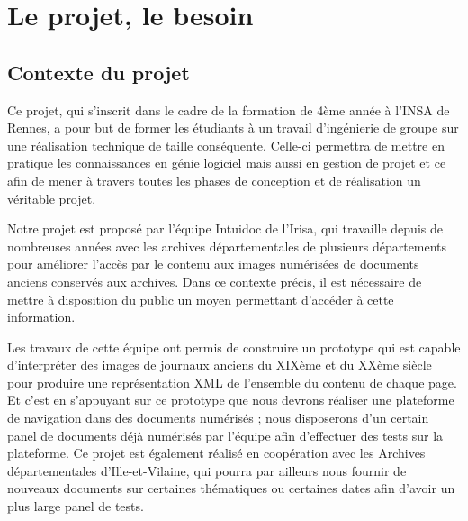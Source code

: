 \section{Le projet, le besoin}
\label{sec:intro}

    \subsection{Contexte du projet}
    \label{subsec:contexte}
    Ce projet, qui s’inscrit dans le cadre de la formation de 4ème année à l’INSA de Rennes,
    a pour but de former les étudiants à un travail d’ingénierie de groupe sur une réalisation
    technique de taille conséquente. Celle-ci permettra de mettre en pratique les connaissances
    en génie logiciel mais aussi en gestion de projet et ce afin de mener à travers toutes
    les phases de conception et de réalisation un véritable projet.

    Notre projet est proposé par l’équipe Intuidoc de l’Irisa, qui travaille depuis de nombreuses
    années avec les archives départementales de plusieurs départements pour améliorer l’accès par
    le contenu aux images numérisées de documents anciens conservés aux archives.
    Dans ce contexte précis, il est nécessaire de mettre à disposition du public un moyen
    permettant d’accéder à cette information.

    Les travaux de cette équipe ont permis de construire un prototype qui est capable d’interpréter
    des images de journaux anciens du XIXème et du XXème siècle pour produire une représentation XML
    de l’ensemble du contenu de chaque page. Et c’est en s’appuyant sur ce prototype que nous devrons
    réaliser une plateforme de navigation dans des documents numérisés ; nous disposerons
    d’un certain panel de documents déjà numérisés par l’équipe afin d’effectuer des tests
    sur la plateforme. Ce projet est également réalisé en coopération avec les Archives départementales
    d’Ille-et-Vilaine, qui pourra par ailleurs nous fournir de nouveaux documents sur certaines
    thématiques ou certaines dates afin d’avoir un plus large panel de tests.

